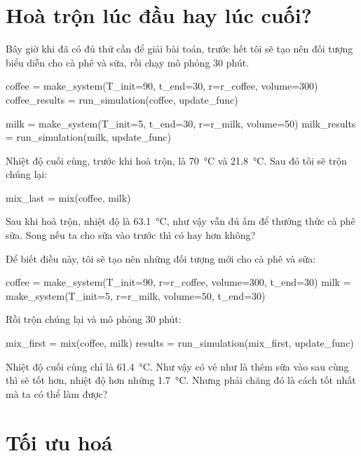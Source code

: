 \documentclass[12pt, openany]{book}
\theoremstyle{exercise}
\begin{document}
\section{Hoà trộn lúc đầu hay lúc cuối?}

Bây giờ khi đã có đủ thứ cần để giải bài toán, trước hết tôi sẽ tạo nên đối tượng biểu diễn cho cà phê và sữa, rồi chạy mô phỏng 30 phút.

\begin{python}
coffee = make_system(T_init=90, t_end=30, 
                     r=r_coffee, volume=300)
coffee_results = run_simulation(coffee, update_func)

milk = make_system(T_init=5, t_end=30, 
                   r=r_milk, volume=50)
milk_results = run_simulation(milk, update_func)
\end{python}

Nhiệt độ cuối cùng, trước khi hoà trộn, là \SI{70}{\celsius} và \SI{21.8}{\celsius}.  Sau đó tôi sẽ trộn chúng lại:

\begin{python}
mix_last = mix(coffee, milk)
\end{python}

Sau khi hoà trộn, nhiệt độ là \SI{63.1}{\celsius}, như vậy vẫn đủ ấm để thưởng thức cà phê sữa. Song nếu ta cho sữa vào trước thì có hay hơn không?

Để biết điều này, tôi sẽ tạo nên những đối tượng mới cho cà phê và sữa:

\begin{python}
coffee = make_system(T_init=90, r=r_coffee, 
                     volume=300, t_end=30)
milk = make_system(T_init=5, r=r_milk, 
                   volume=50, t_end=30)
\end{python}

Rồi trộn chúng lại và mô phỏng 30 phút:

\begin{python}
mix_first = mix(coffee, milk)
results = run_simulation(mix_first, update_func)
\end{python}

Nhiệt độ cuối cùng chỉ là \SI{61.4}{\celsius}.  Như vậy có vẻ như là thêm sữa vào sau cùng thì sẽ tốt hơn, nhiệt độ hơn những \SI{1.7}{\celsius}.  Nhưng phải chăng đó là cách tốt nhất mà ta có thể làm được?


\section{Tối ưu hoá}
\end{document}
